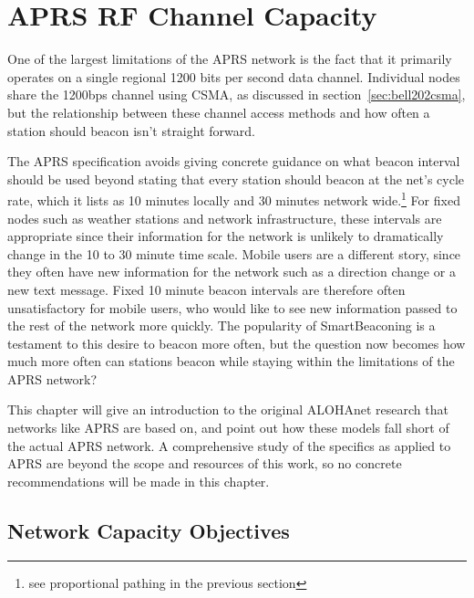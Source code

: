 \chapter{APRS RF Channel Capacity}
\label{chap:channelcapacity}

One of the largest limitations of the APRS network is the fact that
it primarily operates on a single regional 1200 bits per second data channel. 
Individual nodes share the 1200bps channel using 
CSMA, as discussed in section~\ref{sec:bell202csma}, but the relationship between 
these channel access methods and
how often a station should beacon isn't straight forward.

The APRS specification avoids giving concrete guidance on what beacon interval should
be used beyond stating that every station should beacon at the net's cycle rate,
which it lists as 10 minutes locally and 30 minutes 
network wide\cite[p.~9]{aprsspec}.\footnote{see proportional
pathing in the previous section}
For fixed nodes such as weather stations and network infrastructure, 
these intervals are appropriate since their information for the network
is unlikely to dramatically change in the 10 to 30 minute time scale.
Mobile users are a different story,
since they often have new information for the network
such as a direction change or a new text message.
Fixed 10 minute beacon intervals are therefore often unsatisfactory for
mobile users, who would like to see new information passed to the rest of
the network more quickly.
The popularity of SmartBeaconing is a testament to this desire to beacon more often,
but the question now becomes how much more often can stations beacon while
staying within the limitations of the APRS network?

This chapter will give an introduction to the original ALOHAnet research
that networks like APRS are based on,
and point out how these models fall short of the actual APRS network.
A comprehensive study of the specifics as applied to APRS are beyond
the scope and resources of this work, so no concrete recommendations will be
made in this chapter.

\section{Network Capacity Objectives}

